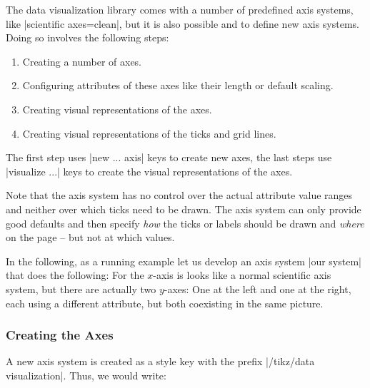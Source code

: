 The data visualization library comes with a number of predefined axis
systems, like |scientific axes=clean|, but it is also possible and
to define new axis systems. Doing so involves the following steps:

\begin{enumerate}
\item Creating a number of axes.
\item Configuring attributes of these axes like their length or
  default scaling.
\item Creating visual representations of the axes.
\item Creating visual representations of the ticks and grid lines.
\end{enumerate}

The first step uses |new ... axis| keys to create new axes, the
last steps use |visualize ...| keys to create the visual
representations of the axes.

Note that the axis system has no control over the actual attribute
value ranges and neither over which ticks need to be drawn. The axis
system can only provide good defaults and then specify \emph{how} the
ticks or labels should be drawn and \emph{where} on the page -- but
not at which values.

In the following, as a running example let us develop an axis system
|our system| that does the following: For the $x$-axis is looks like a
normal scientific axis system, but there are actually two $y$-axes:
One at the left and one at the right, each using a different
attribute, but both coexisting in the same picture.

\subsubsection{Creating the Axes}

A new axis system is created as a style key with the prefix
|/tikz/data visualization|. Thus, we would write:
\begin{codeexample}
\end{codeexample}

